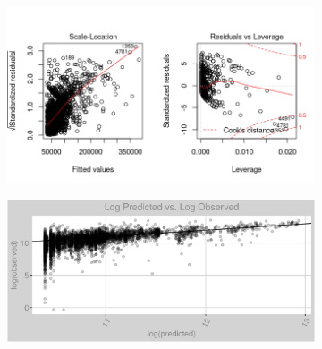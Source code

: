 \begin{figure}[h]
\centering
\begin{subfigure}{1\textwidth}
\centering
\includegraphics[width=.99\textwidth, height=0.425\textheight]{Images/electricity_psf_rfe_res_2.png}
\end{subfigure}
\begin{subfigure}{1\textwidth}
\centering
\includegraphics[width=.99\textwidth, height=0.475\textheight]{Images/electricity_psf_rfe_pvo.png}
\end{subfigure}
\end{figure}
\FloatBarrier
\newpage
